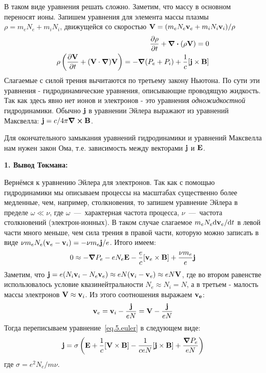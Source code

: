 \documentclass[10pt, a4paper]{article}
\numberwithin{equation}{section}
\begin{document}
В таком виде уравнения решать сложно. Заметим, что массу в основном переносят ионы. Запишем уравнения для элемента массы плазмы $\rho = m_e N_e + m_i N_i$, движущейся со скоростью $\vb{V} = (m_e N_e \vb{v}_e + m_i N_i \vb{v}_i)/\rho$
\begin{align}
	\pdv{\rho}{t} + \divergence{\left( \rho \vb{V} \right)} = 0 \\
	\rho\left( \pdv{\vb{V}}{t} + (\vb{V}\cdot\grad)\vb{V} \right) = -\grad{(P_e + P_i)} + \frac{1}{c}[\vb{j}\times\vb{B}]
\end{align}
Слагаемые с силой трения вычитаются по третьему закону Ньютона.
По сути эти уравнения - гидродинамические уравнения, описывающие проводящую жидкость. Так как здесь явно нет ионов и электронов - это уравнения \textit{одножидкостной} гидродинамики.
Обычно $\vb{j}$ в уравнении Эйлера выражают из уравнений Максвелла: $\vb{j} = c/4\pi\curl\vb{B}$.

Для окончательного замыкания уравнений гидродинамики и уравнений Максвелла нам нужен закон Ома, т.е. зависимость между векторами $\vb{j}$ и $\vb{E}$. 

\textbf{1. Вывод Токмана:} 

Вернёмся к уравнению Эйлера для электронов. Так как с помощью гидродинамики мы описываем процессы на масштабах существенно более медленные, чем, например, столкновения, то запишем уравнение Эйлера в пределе $\omega \ll \nu$, где $\omega$~---~характерная частота процесса, $\nu$~---~частота столкновений (электрон-ионных). В таком случае слагаемое $m_e N_e \dd \vb{v}_e/\dd t$ в левой части много меньше, чем сила трения в правой части, которую можно записать в виде $\nu m_e N_e (\vb{v}_e - \vb{v}_i) = -\nu m_e \vb{j} / e$. Итого имеем:
\begin{equation}
	\label{eq.5.euler}
	0 \approx -\grad{P_e} - e N_e \vb{E} - \frac{e}{c}[\vb{v}_e \times \vb{B}] + \frac{\nu m_e}{e}\vb{j}
\end{equation}
Заметим, что $\vb{j} = e (N_i \vb{v}_i - N_e \vb{v}_e) \approx e N (\vb{v}_i - \vb{v}_e) \approx e N \vb{V} $, где во втором равенстве использовалось условие квазинейтральности $N_e \approx N_i = N$, а в третьем - малость массы электронов $\vb{V} \approx \vb{v}_i$. Из этого соотношения выражаем $\vb{v_e}$:
\begin{equation}
	\vb{v}_e = \vb{v}_i - \frac{\vb{j}}{eN} = \vb{V} - \frac{\vb{j}}{eN}
\end{equation}
Тогда переписываем уравнение~\eqref{eq.5.euler} в следующем виде:
\begin{equation}
	\label{eq.5.Ohm}
	\vb{j} = \sigma \left( \vb{E} + \frac{1}{c}[\vb{V}\times\vb{B}] - \frac{1}{ceN}[\vb{j}\times\vb{B}] + \frac{\grad{P_e}}{eN} \right)
\end{equation}
где $\sigma = e^2 N_e / m \nu$.
\end{document}
